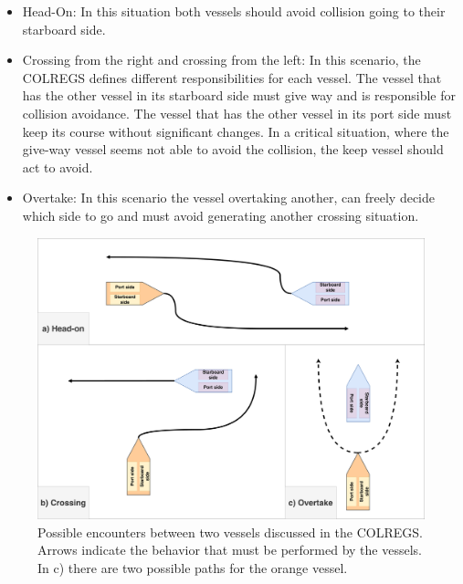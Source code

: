     \begin{itemize}
        \item Head-On: In this situation both vessels should avoid collision going to their starboard side.
        \item Crossing from the right and crossing from the left: In this scenario, the \ac{COLREGS} defines different responsibilities for each vessel. The vessel that has the other vessel in its starboard side must give way and is responsible for collision avoidance. The vessel that has the other vessel in its port side must keep its course without significant changes. In a critical situation, where the give-way vessel seems not able to avoid the collision, the keep vessel should act to avoid.
        \item Overtake: In this scenario the vessel overtaking another, can freely decide which side to go and must avoid generating another crossing situation.
    \end{itemize}
    
    \begin{figure}[H]
        \centering
        \includegraphics[scale=0.125]{figs/Chap2/Encounters.pdf}
        \caption{Possible encounters between two vessels discussed in the \ac{COLREGS}. Arrows indicate the behavior that must be performed by the vessels. In c) there are two possible paths for the orange vessel. }
        \label{fig:chap2_encounters}
    \end{figure}

    
